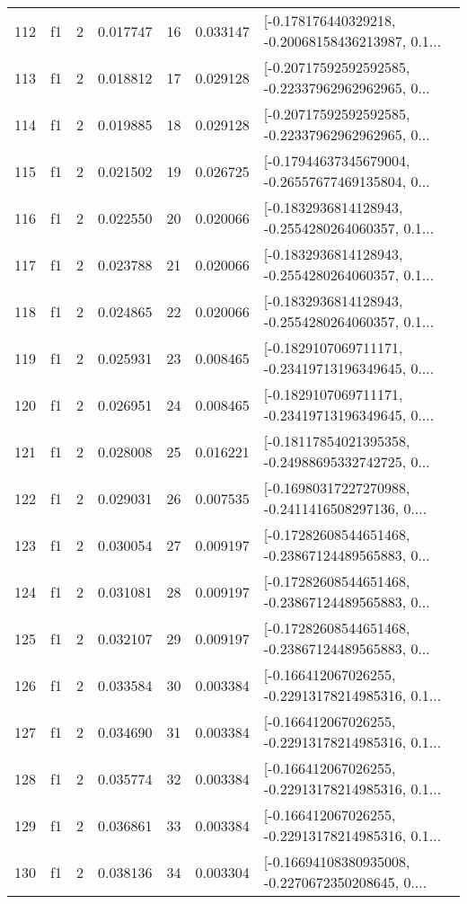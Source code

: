 \begin{tabular}{lllrlrl}
112 &  f1 &   2 &  0.017747 &   16 &  0.033147 &  [-0.178176440329218, -0.20068158436213987, 0.1... \\
113 &  f1 &   2 &  0.018812 &   17 &  0.029128 &  [-0.20717592592592585, -0.22337962962962965, 0... \\
114 &  f1 &   2 &  0.019885 &   18 &  0.029128 &  [-0.20717592592592585, -0.22337962962962965, 0... \\
115 &  f1 &   2 &  0.021502 &   19 &  0.026725 &  [-0.17944637345679004, -0.26557677469135804, 0... \\
116 &  f1 &   2 &  0.022550 &   20 &  0.020066 &  [-0.1832936814128943, -0.2554280264060357, 0.1... \\
117 &  f1 &   2 &  0.023788 &   21 &  0.020066 &  [-0.1832936814128943, -0.2554280264060357, 0.1... \\
118 &  f1 &   2 &  0.024865 &   22 &  0.020066 &  [-0.1832936814128943, -0.2554280264060357, 0.1... \\
119 &  f1 &   2 &  0.025931 &   23 &  0.008465 &  [-0.1829107069711171, -0.23419713196349645, 0.... \\
120 &  f1 &   2 &  0.026951 &   24 &  0.008465 &  [-0.1829107069711171, -0.23419713196349645, 0.... \\
121 &  f1 &   2 &  0.028008 &   25 &  0.016221 &  [-0.18117854021395358, -0.24988695332742725, 0... \\
122 &  f1 &   2 &  0.029031 &   26 &  0.007535 &  [-0.16980317227270988, -0.2411416508297136, 0.... \\
123 &  f1 &   2 &  0.030054 &   27 &  0.009197 &  [-0.17282608544651468, -0.23867124489565883, 0... \\
124 &  f1 &   2 &  0.031081 &   28 &  0.009197 &  [-0.17282608544651468, -0.23867124489565883, 0... \\
125 &  f1 &   2 &  0.032107 &   29 &  0.009197 &  [-0.17282608544651468, -0.23867124489565883, 0... \\
126 &  f1 &   2 &  0.033584 &   30 &  0.003384 &  [-0.166412067026255, -0.22913178214985316, 0.1... \\
127 &  f1 &   2 &  0.034690 &   31 &  0.003384 &  [-0.166412067026255, -0.22913178214985316, 0.1... \\
128 &  f1 &   2 &  0.035774 &   32 &  0.003384 &  [-0.166412067026255, -0.22913178214985316, 0.1... \\
129 &  f1 &   2 &  0.036861 &   33 &  0.003384 &  [-0.166412067026255, -0.22913178214985316, 0.1... \\
130 &  f1 &   2 &  0.038136 &   34 &  0.003304 &  [-0.16694108380935008, -0.2270672350208645, 0.... \\

\end{tabular}
